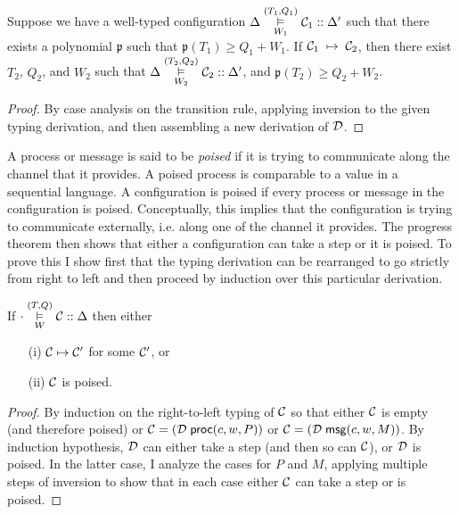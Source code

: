 \begin{theorem}
\label{thm:preservation}
Suppose we have a well-typed configuration
$\Delta \overset{(T_1, Q_1)}{\underset{W_1}{\vDash}} \mathcal{C}_1 :: \Delta'$ such
that there exists a polynomial $\mathfrak{p}$ such that $\mathfrak{p}(T_1) \geq Q_1+W_1$.
If $\mathcal{C}_1 \; \mapsto \; \mathcal{C}_2$, then there exist $T_2$, $Q_2$, and $W_2$ such
that $\Delta \overset{(T_2, Q_2)}{\underset{W_2}{\vDash}} \mathcal{C}_2 :: \Delta'$,
and $\mathfrak{p}(T_2) \geq Q_2+W_2$.
\end{theorem}
\begin{proof}
  By case analysis on the transition rule, applying inversion to the
  given typing derivation, and then assembling a new derivation of
  $\mathcal{D}$.
\end{proof}

A process or message is said to be \emph{poised} if it is trying to
communicate along the channel that it provides.  A poised process is
comparable to a value in a sequential language. A configuration is
poised if every process or message in the configuration is poised.
Conceptually, this implies that the configuration is trying to communicate
externally, i.e. along one of the channel it provides.
The progress theorem then shows that either a configuration can take a
step or it is poised.  To prove this I show first that the typing
derivation can be rearranged to go strictly from right to left and
then proceed by induction over this particular derivation.

\begin{theorem}
\label{thm:progress}
\mbox{}
If $\cdot \overset{(T, Q)}{\underset{W}{\vDash}} \mathcal{C} :: \Delta$ then either
\begin{enumerate}
\item[(i)] $\mathcal{C} \mapsto \mathcal{C}'$ for some $\mathcal{C}'$, or
\item[(ii)] $\mathcal{C}$ is poised.
\end{enumerate}
\end{theorem}
\begin{proof}
By induction on the right-to-left typing of $\mathcal{C}$ so that either
$\mathcal{C}$ is empty (and therefore poised) or
$\mathcal{C} = (\mathcal{D}\; \mathsf{proc}(c, w, P))$ or
$\mathcal{C} = (\mathcal{D}\; \mathsf{msg}(c, w, M))$. By induction hypothesis, $\mathcal{D}$ can
either take a step (and then so can $\mathcal{C}$), or $\mathcal{D}$ is poised.  In
the latter case, I
analyze the cases for $P$ and $M$, applying multiple steps of
inversion to show that in each
case either $\mathcal{C}$ can take a step or is poised.
\end{proof}


